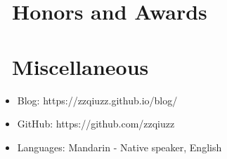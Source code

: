\documentclass{resume}
\begin{document}
\section{\faHeartO\ Honors and Awards}

\section{\faInfo\ Miscellaneous}
\begin{itemize}[parsep=0.5ex]
  \item Blog: https://zzqiuzz.github.io/blog/
  \item GitHub: https://github.com/zzqiuzz
  \item Languages: Mandarin - Native speaker, English
\end{itemize}

%
%
\end{document}
